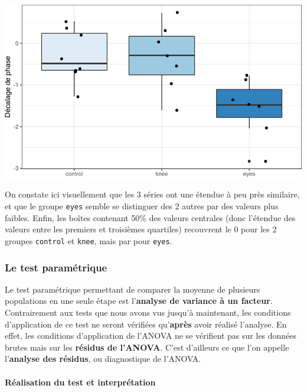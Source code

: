 \documentclass[
  a4paper,
]{article}
\begin{document}
\begin{center}\includegraphics[width=0.9\linewidth]{figure/unnamed-chunk-77-1} \end{center}

On constate ici visuellement que les 3 séries ont une étendue à peu près similaire, et que le groupe \texttt{eyes} semble se distinguer des 2 autres par des valeurs plus faibles. Enfin, les boîtes contenant 50\% des valeurs centrales (donc l'étendue des valeurs entre les premiers et troisièmes quartiles) recouvrent le 0 pour les 2 groupes \texttt{control} et \texttt{knee}, mais par pour \texttt{eyes}.

\hypertarget{le-test-paramuxe9trique-3}{%
\subsubsection{Le test paramétrique}\label{le-test-paramuxe9trique-3}}

Le test paramétrique permettant de comparer la moyenne de plusieurs populations en une seule étape est l'\textbf{analyse de variance à un facteur}. Contrairement aux tests que nous avons vus jusqu'à maintenant, les conditions d'application de ce test ne seront vérifiées qu'\textbf{après} avoir réalisé l'analyse. En effet, les conditions d'application de l'ANOVA ne se vérifient pas sur les données brutes mais sur les \textbf{résidus de l'ANOVA}. C'est d'ailleurs ce que l'on appelle l'\textbf{analyse des résidus}, ou diagnostique de l'ANOVA.

\hypertarget{ruxe9alisation-du-test-et-interpruxe9tation-3}{%
\paragraph{Réalisation du test et interprétation}\label{ruxe9alisation-du-test-et-interpruxe9tation-3}}
\end{document}
